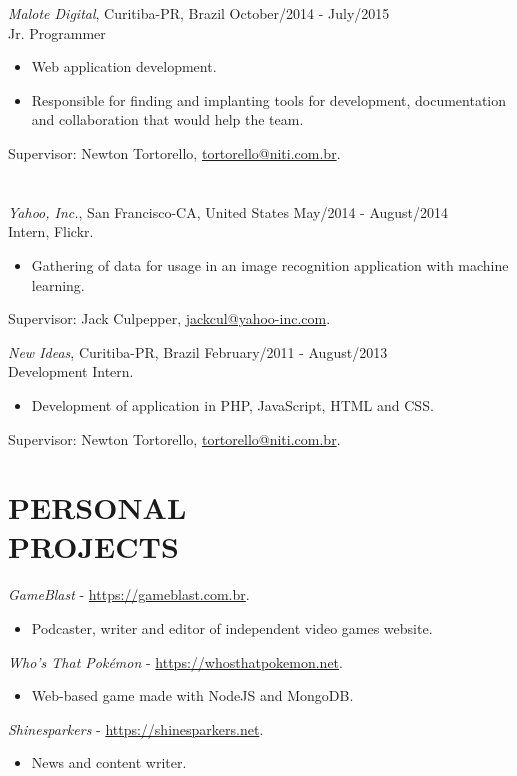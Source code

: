 \documentclass[margin]{res}
\begin{document}
\begin{resume}
			{\sl Malote Digital}, Curitiba-PR, Brazil \hfill October/2014 - July/2015 \\
			Jr. Programmer
			\begin{itemize}
				\itemsep -2pt
		    	\item Web application development.
				\item Responsible for finding and implanting tools for development, documentation and collaboration that would help the team.
			\end{itemize}
			Supervisor: Newton Tortorello, \href{mailto:tortorello@niti.com.br}{tortorello@niti.com.br}.
			\\\\\\
			{\sl Yahoo, Inc.}, San Francisco-CA, United States \hfill May/2014 - August/2014 \\
			Intern, Flickr.
			\begin{itemize}
				\itemsep -2pt
		    	\item Gathering of data for usage in an image recognition application with machine learning.
			\end{itemize}
			Supervisor: Jack Culpepper, \href{mailto:jackcul@yahoo-inc.com}{jackcul@yahoo-inc.com}.

			{\sl New Ideas}, Curitiba-PR, Brazil \hfill February/2011 - August/2013 \\
			Development Intern.
			\begin{itemize}
				\itemsep -2pt
		    	\item Development of application in PHP, JavaScript, HTML and CSS.
			\end{itemize}
			Supervisor: Newton Tortorello, \href{mailto:tortorello@niti.com.br}{tortorello@niti.com.br}.
			
		\section{PERSONAL \\ PROJECTS}
			{\sl GameBlast} - \href{https://gameblast.com.br}{https://gameblast.com.br}.
			\begin{itemize}
				\item[] Podcaster, writer and editor of independent video games website.
			\end{itemize}
			{\sl Who's That Pokémon} - \href{https://whosthatpokemon.net}{https://whosthatpokemon.net}.
			\begin{itemize}
				\item[] Web-based game made with NodeJS and MongoDB.
			\end{itemize}
			{\sl Shinesparkers} - \href{https://shinesparkers.net}{https://shinesparkers.net}.
			\begin{itemize}
				\item[] News and content writer.
			\end{itemize}
	

\end{resume}
\end{document}
